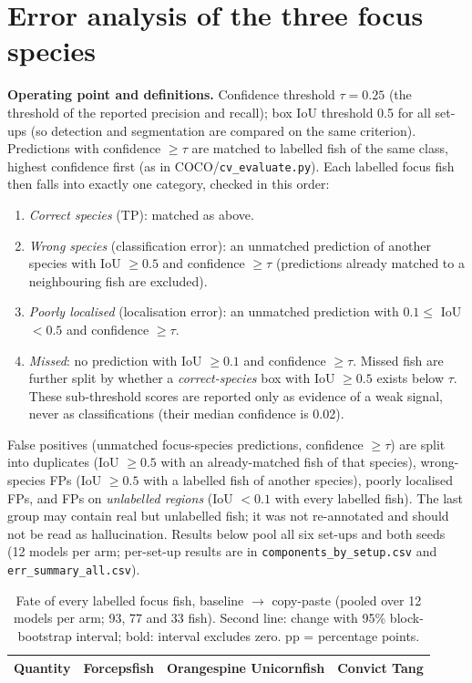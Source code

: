 \documentclass[11pt,a4paper]{article}
\begin{document}
\section{Error analysis of the three focus species}
\textbf{Operating point and definitions.} Confidence threshold $\tau = 0.25$ (the threshold of the reported precision and recall);
box IoU threshold 0.5 for all set-ups (so detection and segmentation are compared on the same criterion). Predictions with
confidence $\geq\tau$ are matched to labelled fish of the same class, highest confidence first (as in COCO/\texttt{cv\_evaluate.py}).
Each labelled focus fish then falls into exactly one category, checked in this order:
\begin{enumerate}[label=(\alph*)]
\item \emph{Correct species} (TP): matched as above.
\item \emph{Wrong species} (classification error): an unmatched prediction of another species with IoU $\geq 0.5$ and confidence
$\geq\tau$ (predictions already matched to a neighbouring fish are excluded).
\item \emph{Poorly localised} (localisation error): an unmatched prediction with $0.1 \le$ IoU $<0.5$ and confidence $\geq\tau$.
\item \emph{Missed}: no prediction with IoU $\geq 0.1$ and confidence $\geq\tau$. Missed fish are further split by whether a
\emph{correct-species} box with IoU $\geq 0.5$ exists below $\tau$. These sub-threshold scores are reported only as evidence of a weak
signal, never as classifications (their median confidence is 0.02).
\end{enumerate}
False positives (unmatched focus-species predictions, confidence $\geq\tau$) are split into duplicates (IoU $\geq0.5$ with an
already-matched fish of that species), wrong-species FPs (IoU $\geq0.5$ with a labelled fish of another species), poorly localised
FPs, and FPs on \emph{unlabelled regions} (IoU $<0.1$ with every labelled fish). The last group may contain real but unlabelled
fish; it was not re-annotated and should not be read as hallucination. Results below pool all six set-ups and both seeds (12
models per arm; per-set-up results are in \texttt{components\_by\_setup.csv} and \texttt{err\_summary\_all.csv}).

\begin{table}[H]\centering
\caption{Fate of every labelled focus fish, baseline $\rightarrow$ copy-paste (pooled over 12 models per arm; 93, 77 and 33 fish).
Second line: change with 95\% block-bootstrap interval; bold: interval excludes zero. pp = percentage points.}
\label{tab:err}\footnotesize
\begin{tabularx}{\linewidth}{@{}p{4.4cm}YYY@{}}\toprule
Quantity & Forcepsfish & Orangespine Unicornfish & Convict Tang \\\midrule

\bottomrule\end{tabularx}\end{table}
\end{document}
